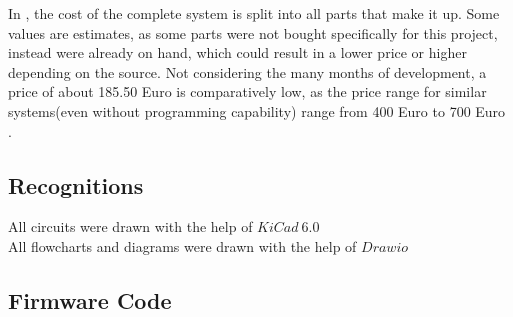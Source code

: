 \noindent In , the cost of the complete system is split into all parts that make it up. Some values are estimates, as some parts were not bought specifically for this project, instead were already on hand, which could result in a lower price or higher depending on the source. Not considering the many months of development, a price of about 185.50 Euro is comparatively low, as the price range for similar systems(even without programming capability) range from 400 Euro  to 700 Euro . \\


\subsection{Recognitions}
\label{Recognitions}
All circuits were drawn with the help of $KiCad\ 6.0$\\

\noindent All flowcharts and diagrams were drawn with the help of $Drawio$

\pagebreak

\subsection{Firmware Code}



\vspace{2cm}


